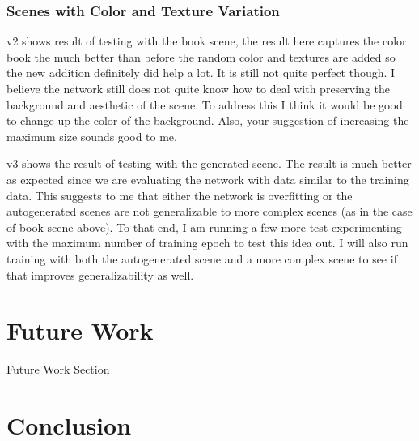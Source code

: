 \documentclass[acmsmall]{acmart}
\begin{document}
\subsubsection{Scenes with Color and Texture Variation}
\label{subsubsec:with_texture}

v2 shows result of testing with the book scene, the result here captures the color book the much better than before the random color and textures are added so the new addition definitely did help a lot. It is still not quite perfect though. I believe the network still does not quite know how to deal with preserving the background and aesthetic of the scene. To address this I think it would be good to change up the color of the background. Also, your suggestion of increasing the maximum size sounds good to me.

v3 shows the result of testing with the generated scene. The result is much better as expected since we are evaluating the network with data similar to the training data. This suggests to me that either the network is overfitting or the autogenerated scenes are not generalizable to more complex scenes (as in the case of book scene above). To that end, I am running a few more test experimenting with the maximum number of training epoch to test this idea out. I will also run training with both the autogenerated scene and a more complex scene to see if that improves generalizability as well.




\section{Future Work}
\label{sec:future}

Future Work Section

\section{Conclusion}
\label{sec:conclusion}



\end{document}
